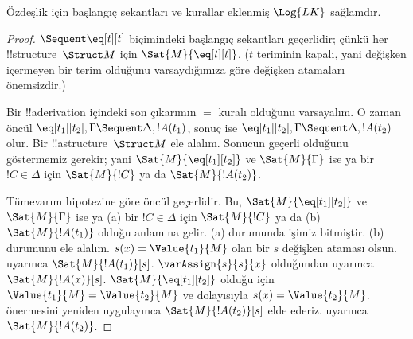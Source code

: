 



\begin{prop}
Özdeşlik için başlangıç sekantları ve kurallar eklenmiş $\Log{LK}$ sağlamdır.
\end{prop}

\begin{proof}
${}\Sequent\eq[t][t]$ biçimindeki başlangıç sekantları geçerlidir; çünkü her
!!{structure}~$\Struct M$ için $\Sat{M}{\eq[t][t]}$. ($t$ teriminin kapalı,
yani değişken içermeyen bir terim olduğunu varsaydığımıza göre değişken
atamaları önemsizdir.)

Bir !!a{derivation} içindeki son çıkarımın $=$ kuralı olduğunu varsayalım. O zaman
öncül $\eq[t_1][t_2],\Gamma\Sequent\Delta,!A(t_1)$, sonuç ise
$\eq[t_1][t_2],\Gamma\Sequent\Delta,!A(t_2)$ olur. Bir
!!a{structure}~$\Struct M$ ele alalım. Sonucun geçerli olduğunu göstermemiz
gerekir; yani $\Sat{M}{\eq[t_1][t_2]}$ ve $\Sat{M}{\Gamma}$ ise ya bir
$!C\in\Delta$ için $\Sat{M}{!C}$ ya da $\Sat{M}{!A(t_2)}$.

Tümevarım hipotezine göre öncül geçerlidir. Bu, $\Sat{M}{\eq[t_1][t_2]}$
ve $\Sat{M}{\Gamma}$ ise ya (a) bir $!C\in\Delta$ için $\Sat{M}{!C}$ ya da
(b) $\Sat{M}{!A(t_1)}$ olduğu anlamına gelir. (a) durumunda işimiz bitmiştir.
(b) durumunu ele alalım. $s(x)=\Value{t_1}{M}$ olan bir $s$ değişken ataması
olsun.  uyarınca
$\Sat{M}{!A(t_1)}[s]$. $\varAssign{s}{s}{x}$ olduğundan
 uyarınca $\Sat{M}{!A(x)}[s]$.
$\Sat{M}{\eq[t_1][t_2]}$ olduğu için $\Value{t_1}{M}=\Value{t_2}{M}$ ve
dolayısıyla $s(x)=\Value{t_2}{M}$. 
önermesini yeniden uygulayınca $\Sat{M}{!A(t_2)}[s]$ elde ederiz.
 uyarınca $\Sat{M}{!A(t_2)}$.
\end{proof}

